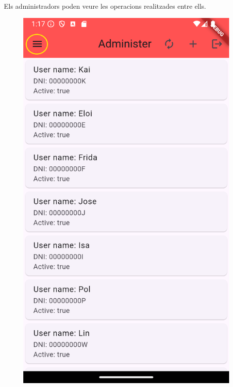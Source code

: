 \documentclass[a4paper,12pt,twoside]{ThesisStyle}
\begin{document}
Els administradors poden veure les operacions realitzades entre ells.


\begin{figure}[h]
    \centering
    \begin{minipage}{0.31\textwidth}
        \includegraphics[width=\linewidth]{imatges/adminMain.png}

\end{minipage}
\end{figure}
\end{document}
